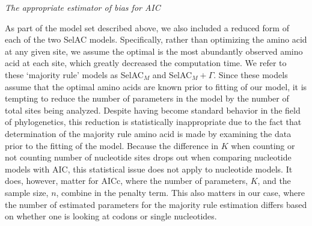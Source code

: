 \documentclass[12pt,letterpaper]{article}
\renewcommand{\subsection}[1]{%
\bigskip
\begin{center}
\begin{large}
\normalfont\itshape #1
\end{large}
\end{center}}
\newcommand{\selac}{SelAC\xspace}
\newcommand{\selacmaj}{SelAC$_{M}$\xspace}
\newcommand{\selacmajplusgamma}{SelAC$_{M}+\Gamma$\xspace}
\begin{document}
\subsection{The appropriate estimator of bias for AIC}
As part of the model set described above, we also included a reduced form of each of the two \selac models.
Specifically, rather than optimizing the amino acid at any given site, we assume the optimal is the most abundantly observed amino acid at each site, which greatly decreased the computation time.
We refer to these `majority rule' models as \selacmaj and \selacmajplusgamma.
Since these models assume that the optimal amino acids are known prior to fitting of our model, it is tempting to reduce the number of parameters in the model by the number of total sites being analyzed.
Despite having become standard behavior in the field of phylogenetics, this reduction is statistically inappropriate due to the fact that determination of the majority rule amino acid is made by examining the data prior to the fitting of the model.
Because the difference in $K$ when counting or not counting number of nucleotide sites drops out when comparing nucleotide models with AIC, this statistical issue does not apply to nucleotide models.
It does, however, matter for AICc, where the number of parameters, $K$, and the sample size, $n$, combine in the penalty term.
This also matters in our case, where the number of estimated parameters for the majority rule estimation differs based on whether one is looking at codons or single nucleotides.
\end{document}
